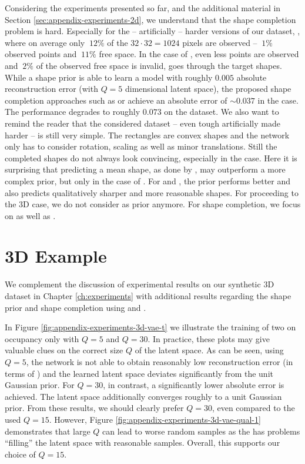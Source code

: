 Considering the experiments presented so far, and the additional material
in Section \ref{sec:appendix-experiments-2d}, we understand that the
shape completion problem is hard. Especially for the -- artificially --
harder versions of our dataset, \ie \moderate, where on average
only $~12\%$ of the $32\cdot 32 = 1024$ pixels are observed
-- $~1\%$ observed points and $~11\%$ free space. 
In the case of \hard, even less points are observed and $~2\%$ of the
observed free space is invalid, \ie goes through the target shapes.
While a \VAE shape prior is able to
learn a model with roughly $0.005$ absolute reconstruction error (with
$Q = 5$ dimensional latent space), the proposed shape completion approaches
such as \AML or \EVAE achieve an absolute error of $\sim 0.037$ in the \easy case.
The performance degrades to roughly $0.073$ on the \hard dataset.
We also want to remind the reader that the considered dataset -- even tough
artificially made harder -- is still very simple. The rectangles are convex shapes
and the network only has to consider rotation, scaling as well as minor
translations. Still the completed shapes do not always look convincing,
especially in the \hard case. Here it is surprising that predicting a mean
shape, as done by \PPCA, may outperform a more complex
\VAE prior, but only in the case of \ML. For \AML and \EVAE, the \VAE prior
performs better and also predicts qualitatively sharper and more reasonable
shapes. For proceeding to the 3D case, we do not consider
\PPCA as prior anymore. For shape completion, we
focus on \AML as well as \EVAE. %

\FloatBarrier
\newpage
\section{3D Example}
\label{sec:appendix-experiments-3d}

We complement the discussion of experimental results on our synthetic 3D dataset
in Chapter \ref{ch:experiments} with additional
results regarding the \VAE shape prior and shape completion using \AML
and \EVAE.

In Figure \ref{fig:appendix-experiments-3d-vae-t} we illustrate the training
of two \VAEs on occupancy only with $Q = 5$ and $Q = 30$. In practice, these
plots may give valuable clues on the correct size $Q$ of the latent space.
As can be seen, using $Q = 5$, the network is not able to obtain
reasonably low reconstruction error (in terms of \Abs) and the learned latent
space deviates significantly from the unit Gaussian prior. For $Q = 30$,
in contrast, a significantly lower absolute error is achieved.  The latent space
additionally converges roughly to a unit Gaussian prior. From these results,
we should clearly prefer $Q = 30$, even compared to the used $Q = 15$.
However, Figure \ref{fig:appendix-experiments-3d-vae-qual-1} demonstrates
that large $Q$ can lead to worse random samples as the \VAE has problems
``filling'' the latent space with reasonable samples. Overall,
this supports our choice of $Q = 15$.

